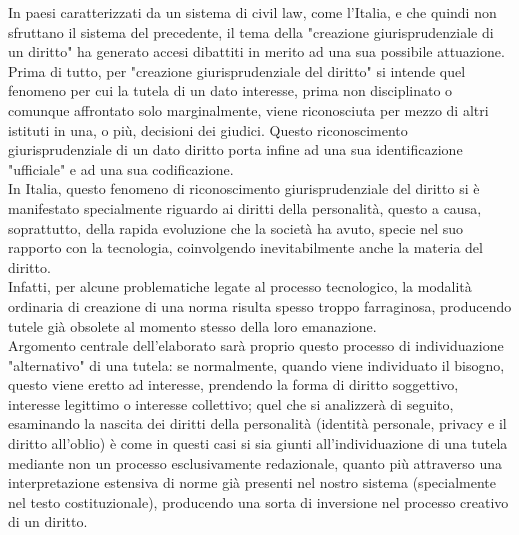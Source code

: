 In paesi caratterizzati da un sistema di civil law, come l'Italia, e che quindi non sfruttano il sistema del precedente, il tema della "creazione giurisprudenziale di un diritto" ha generato accesi dibattiti in merito ad una sua possibile attuazione.
Prima di tutto, per "creazione giurisprudenziale del diritto" si intende quel fenomeno per cui la tutela di un dato interesse, prima non disciplinato o comunque affrontato solo marginalmente, viene riconosciuta per mezzo di altri istituti in una, o più, decisioni dei giudici. Questo riconoscimento giurisprudenziale di un dato diritto porta infine ad una sua identificazione "ufficiale" e ad una sua codificazione. 
\\In Italia, questo fenomeno di riconoscimento giurisprudenziale del diritto si è manifestato specialmente riguardo ai diritti della personalità, questo a causa, soprattutto, della rapida evoluzione che la società ha avuto, specie nel suo rapporto con la tecnologia, coinvolgendo inevitabilmente anche la materia del diritto. 
\\Infatti, per alcune problematiche legate al processo tecnologico, la modalità ordinaria di creazione di una norma risulta spesso troppo farraginosa, producendo tutele già obsolete al momento stesso della loro emanazione. 
\\Argomento centrale dell'elaborato sarà proprio questo processo di individuazione "alternativo" di una tutela: se normalmente, quando viene individuato il bisogno, questo viene eretto ad interesse, prendendo la forma di diritto soggettivo, interesse legittimo o interesse collettivo; quel che si analizzerà di seguito, esaminando la nascita dei diritti della personalità (identità personale, privacy e il diritto all'oblio) è come in questi casi si sia giunti all'individuazione di una tutela mediante non un processo esclusivamente redazionale, quanto più attraverso una interpretazione estensiva di norme già presenti nel nostro sistema (specialmente nel testo costituzionale), producendo una sorta di inversione nel processo creativo di un diritto.
